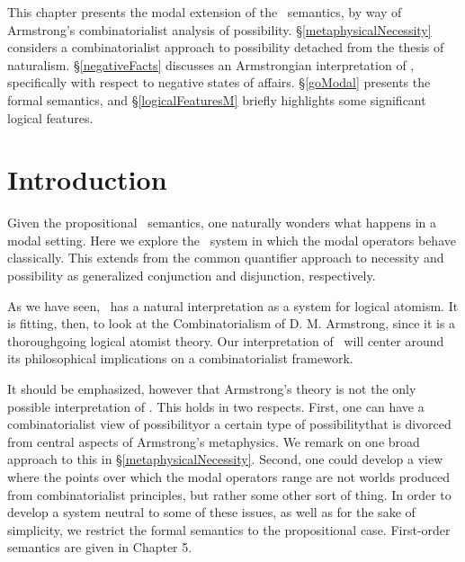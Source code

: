 



\newcommand{\Base}{\ensuremath{\mathcal{B}}}
\newcommand{\Inds}{\ensuremath{\mathcal{I}}}
\newcommand{\Props}{\ensuremath{\mathcal{P}}}
\newcommand{\Rels}{\ensuremath{\mathcal{R}}}
\newcommand{\Univs}{\ensuremath{\mathcal{U}}}
\newcommand{\Facts}{\ensuremath{\mathcal{F}}}
%
%


%


This chapter presents the modal extension of the \GO\ semantics, by way of Armstrong's combinatorialist analysis of possibility. \S\ref{metaphysicalNecessity} considers a combinatorialist approach to possibility detached from the thesis of naturalism. \S\ref{negativeFacts} discusses an Armstrongian interpretation of \GO, specifically with respect to negative states of affairs. \S\ref{goModal} presents the formal semantics, and  \S\ref{logicalFeaturesM} briefly highlights some significant logical features.
\section{Introduction}

Given the propositional \GO\ semantics, one naturally wonders what happens in a modal setting. Here we explore the \GoModal\ system in which the modal operators behave classically. This extends from the common quantifier approach to necessity and possibility as generalized conjunction and disjunction, respectively.

As we have seen, \GO\ has a natural interpretation as a system for logical atomism. It is fitting, then, to look at the Combinatorialism of D. M. Armstrong, since it is a thoroughgoing logical atomist theory. Our interpretation of \GoModal\ will center around its philosophical implications on a combinatorialist framework.

It should be emphasized, however that Armstrong's theory is not the only possible interpretation of \GoModal. This holds in two respects. First, one can have a combinatorialist view of possibility\textemdash or a certain type of possibility\textemdash that is divorced from central aspects of Armstrong's metaphysics. We remark on one broad approach to this in \S\ref{metaphysicalNecessity}. Second, one could develop a view where the points over which the modal operators range are not worlds produced from combinatorialist principles, but rather some other sort of thing. In order to develop a system neutral to some of these issues, as well as for the sake of simplicity, we restrict the formal semantics to the propositional case. First-order semantics are given in Chapter 5.

